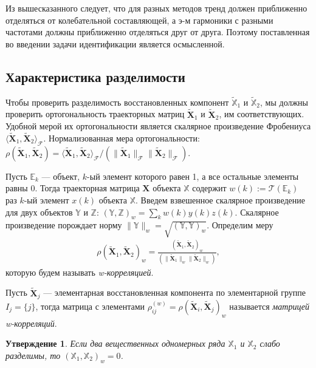 \documentclass[specialist,
               substylefile = spbu.rtx,
               subf,href,colorlinks=true, 12pt]{disser}
\newtheorem{Th}{Утверждение}
\begin{document}
Из вышесказанного следует, что для разных методов тренд должен приближенно отделяться от колебательной составляющей, а э-м гармоники с разными частотами должны приближенно отделяться друг от друга. Поэтому поставленная во введении задачи идентификации является осмысленной.

\subsection{Характеристика разделимости}
\label{sec:sep}
Чтобы проверить разделимость восстановленных компонент $\widetilde{\mathbb{X}}_1$ и $\widetilde{\mathbb{X}}_2$, мы должны проверить ортогональность траекторных матриц $\widetilde{\mathbf{X}}_{1}$ и $\widetilde{\mathbf{X}}_{2}$, им соответствующих. Удобной мерой их ортогональности является скалярное произведение Фробениуса $\langle \widetilde{\mathbf{X}}_{1}, \widetilde{\mathbf{X}}_{2}\rangle_\mathcal{F}$. Нормализованная мера ортогональности: $\rho(\widetilde{\mathbf{X}}_{1}, \widetilde{\mathbf{X}}_{2}) = \langle \widetilde{\mathbf{X}}_{1}, \widetilde{\mathbf{X}}_{2}\rangle_\mathcal{F}/ \left( \| \widetilde{\mathbf{X}}_{1} \|_{\mathcal{F}} \|\widetilde{\mathbf{X}}_{2}\|_{\mathcal{F}} \right)$.

Пусть $\mathbb{E}_k$ --- объект, $k$-ый элемент которого равен 1, а все остальные элементы равны 0. Тогда траекторная матрица $\mathbf{X}$ объекта $\mathbb{X}$ содержит $w(k) := \mathcal{T}(\mathbb{E}_k)$ раз $k$-ый элемент $x(k)$ объекта $\mathbb{X}$. Введем взвешенное скалярное произведение для двух объектов $\mathbb{Y}$ и $\mathbb{Z}$: $(\mathbb{Y}, \mathbb{Z})_w = \sum_k w(k) y(k) z(k)$. Скалярное произведение порождает норму $\|\mathbb{Y}\|_w=\sqrt{(\mathbb{Y}, \mathbb{Y})_w}$. Определим меру
\begin{gather*}
\rho(\widetilde{\mathbf{X}}_{1}, \widetilde{\mathbf{X}}_{2})_w = \frac{\left( \widetilde{\mathbf{X}}_{1}, \widetilde{\mathbf{X}}_{2}\right)_w }{\left( \| \widetilde{\mathbf{X}}_{1} \|_w \|\widetilde{\mathbf{X}}_{2}\|_w \right)},
\end{gather*}
которую будем называть \textit{w-корреляцией}.

Пусть $ \widetilde{\mathbf{X}}_{j}$ --- элементарная восстановленная компонента по элементарной группе $I_j = \{j\}$, тогда матрица с элементами $\rho_{ij}^{(w)} = \rho(\widetilde{\mathbf{X}}_{i}, \widetilde{\mathbf{X}}_{j})_w$ называется \textit{матрицей w-корреляций}.

\begin{Th} \cite[Corollary 6.2]{Golyandina.etal2001} \label{th:sep_wcor}
Если два вещественных одномерных ряда $\mathbb{X}_1$ и $\mathbb{X}_2$ слабо разделимы, то $(\mathbb{X}_1, \mathbb{X}_2)_w = 0$.
\end{Th}
\end{document}
